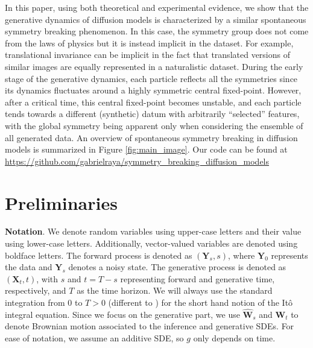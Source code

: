 \documentclass{article}
\begin{document}
In this paper, using both theoretical and experimental evidence, we show that the generative dynamics of diffusion models is characterized by a similar spontaneous symmetry breaking phenomenon. In this case, the symmetry group does not come from the laws of physics but it is instead implicit in the dataset. For example, translational invariance can be implicit in the fact that translated versions of similar images are equally represented in a naturalistic dataset. During the early stage of the generative dynamics, each particle reflects all the symmetries since its dynamics fluctuates around a highly symmetric central fixed-point. However, after a critical time, this central fixed-point becomes unstable, and each particle tends towards a different (synthetic) datum with arbitrarily ``selected'' features, with the global symmetry being apparent only when considering the ensemble of all generated data. An overview of spontaneous symmetry breaking  in diffusion models is summarized in Figure 
 \ref{fig:main_image}. Our code can be found at \href{https://github.com/gabrielraya/symmetry_breaking_diffusion_models}{https://github.com/gabrielraya/symmetry\_breaking\_diffusion\_models}
 

\section{Preliminaries}
 
\textbf{Notation}.  We denote random variables using upper-case letters and their value using lower-case letters. Additionally, vector-valued variables are denoted using boldface letters. The forward process is denoted as $(\mathbf{Y}_s, s)$, where $\mathbf{Y}_0$ represents the data and $\mathbf{Y}_s$ denotes a noisy state. The generative process is denoted as $(\mathbf{X}_t, t)$, with $s$ and $t = T - s$ representing forward and generative time, respectively, and $T$ as the time horizon. We will always use the standard integration from $0$ to $T>0$ (different to \citet{song2021scorebased}) for the short hand notion of the Itô integral equation. Since we focus on the generative part, we use $\mathbf{\hat{W}}_s$ and $\mathbf{W}_t$ to denote Brownian motion associated to the inference and generative SDEs. For ease of notation, we assume an additive SDE, so $g$ only depends on time.
\end{document}
